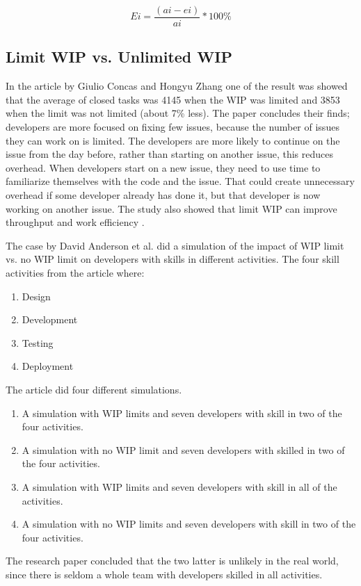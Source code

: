 \documentclass[UKenglish]{ifimaster}  %
\begin{document}
\begin{equation} \label{WIPEQ}
Ei=\frac{(ai-ei)}{ai}*100\%
\end{equation}

\subsection {Limit WIP vs. Unlimited WIP}
\label{sub:wip:vs:wip}
In the article by Giulio Concas and Hongyu Zhang one of the result was showed that the average of closed tasks was 4145 when the WIP was limited and 3853 when the limit was not limited (about 7\% less). The paper concludes their finds; developers are more focused on fixing few issues, because the number of issues they can work on is limited. The developers are more likely to continue on the issue from the day before, rather than starting on another issue, this reduces overhead. When developers start on a new issue, they need to use time to familiarize themselves with the code and the issue. That could create unnecessary overhead if some developer already has done it, but that developer is now working on another issue. The study also showed that limit WIP can improve throughput and work efficiency \parencite{SMR:SMR1599}.

The case by David Anderson et al. \parencite{DavidAnderson} did a simulation of the impact of WIP limit vs. no WIP limit on developers with skills in different activities. The four skill activities from the article where:
\begin{enumerate}
\item Design
\item Development
\item Testing
\item Deployment
\end{enumerate}

The article did four different simulations. 
\begin{enumerate}
\item A simulation with WIP limits and seven developers with skill in two of the four activities. 
\item A simulation with no WIP limit and seven developers with skilled in two of the four activities. 
\item A simulation with WIP limits and seven developers with skill in all of the activities.
\item A simulation with no WIP limits and seven developers with skill in two of the four activities.
\end{enumerate}
The research paper concluded that the two latter is unlikely in the real world, since there is seldom a whole team with developers skilled in all activities.
 
\end{document}
